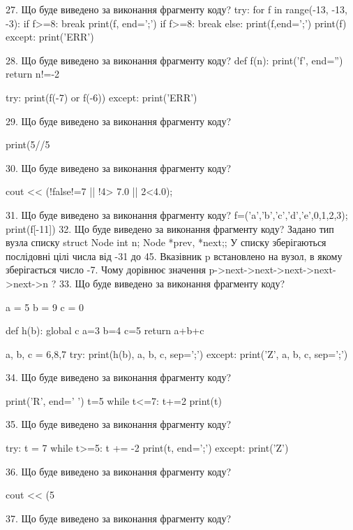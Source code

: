 \documentclass[11pt]{article}
\begin{document}
27. Що буде виведено за виконання фрагменту коду?
try:
    for f in range(-13, -13, -3):
        if f>=8:
            break
        print(f, end=';')
        if f>=8:
            break
    else:
        print(f,end=';')
    print(f)
except:
    print('ERR')

28. Що буде виведено за виконання фрагменту коду?
def f(n):
    print('f', end='')
    return n!=-2

try:
    print(f(-7) or f(-6))
except:
    print('ERR')

29. Що буде виведено за виконання фрагменту коду?

print(5//5%

30. Що буде виведено за виконання фрагменту коду?

cout << (!false!=7 || !4> 7.0 || 2<4.0);

31. Що буде виведено за виконання фрагменту коду?
f=('a','b','c','d','e',0,1,2,3); print(f[-11])
32. Що буде виведено за виконання фрагменту коду?
Задано тип вузла списку struct Node {int n; Node *prev, *next;};
У списку зберігаються послідовні цілі числа від -31 до 45. Вказівник p встановлено на вузол, в якому зберігається число -7.
Чому дорівнює значення p->next->next->next->next->next->n ?
33. Що буде виведено за виконання фрагменту коду?

a = 5
b = 9
c = 0

def h(b):
global c    a=3
    b=4
    c=5
    return a+b+c

a, b, c = 6,8,7
try:
    print(h(b), a, b, c, sep=';')
except:
    print('Z', a, b, c, sep=';')

34. Що буде виведено за виконання фрагменту коду?

print('R', end=' ')
t=5
while t<=7:
    t+=2
print(t)


35. Що буде виведено за виконання фрагменту коду?

try:
    t = 7
    while t>=5:
        t += -2
    print(t, end=';')
except:
    print('Z')


36. Що буде виведено за виконання фрагменту коду?

cout << (5 %

37. Що буде виведено за виконання фрагменту коду?
\end{document}

